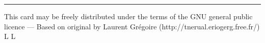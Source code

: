 \vfill \hrule\smallskip
{\smallrm This card may be freely distributed under
the terms of the GNU general public licence ---
Based on original by
Laurent Gr\'egoire  ({\smalltt http://tnerual.eriogerg.free.fr/})}
\supereject
\if L\lr \else\null\vfill\eject\fi
\if L\lr \else\null\vfill\eject\fi
\bye

